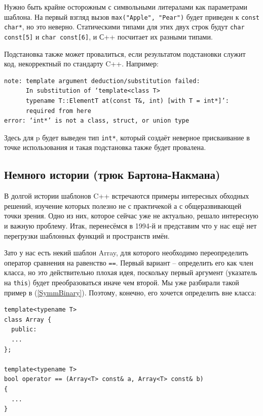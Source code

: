 \documentclass[a4paper,12pt,oneside]{article}
\begin{document}
Нужно быть крайне осторожным с символьными литералами как параметрами шаблона. На первый взгляд вызов \lstinline!max("Apple", "Pear")! будет приведен к \lstinline!const char*!, но это неверно. Статическими типами для этих двух строк будут \lstinline!char const[5]! и \lstinline!char const[6]!, и С++ посчитает их разными типами.

Подстановка также может провалиться, если результатом подстановки служит код, некорректный по стандарту C++. Например:



\begin{verbatim}
note: template argument deduction/substitution failed:
      In substitution of ‘template<class T> 
      typename T::ElementT at(const T&, int) [with T = int*]’:
      required from here
error: ‘int*’ is not a class, struct, or union type
\end{verbatim}

Здесь для p будет выведен тип \lstinline!int*!, который создаёт неверное присваивание в точке использования и такая подстановка также будет провалена.

\subsection{Немного истории (трюк Бартона-Накмана)}

В долгой истории шаблонов C++ встречаются примеры интересных обходных решений, изучение которых полезно не с практичекой а с общеразвивающей точки зрения. Одно из них, которое сейчас уже не актуально, решало интересную и важную проблему. Итак, перенесёмся в 1994-й и представим что у нас ещё нет перегрузки шаблонных функций и пространств имён.

Зато у нас есть некий шаблон Array, для которого необходимо переопределить оператор сравнения на равенство \lstinline!==!. Первый вариант -- определить его как член класса, но это действительно плохая идея, поскольку первый аргумент (указатель на \lstinline!this!) будет преобразоваться иначе чем второй. Мы уже разбирали такой пример в (\ref{SymmBinary}). Поэтому, конечно, его хочется определить вне класса:

\begin{lstlisting}
template<typename T> 
class Array { 
  public: 
  ...
}; 

template<typename T> 
bool operator == (Array<T> const& a, Array<T> const& b) 
{ 
  ... 
} 
\end{lstlisting}
\end{document}
